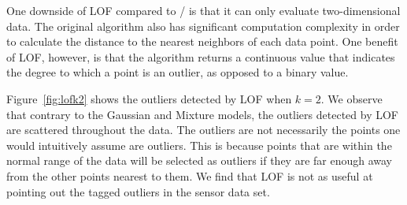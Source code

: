 One downside of LOF compared to \dBoost/ is that it can only evaluate two-dimensional data.
The original algorithm also has significant computation complexity in order to calculate the distance to the nearest neighbors of each data point.
One benefit of LOF, however, is that the algorithm returns a continuous value that indicates the degree to which a point is an outlier, as opposed to a binary value.

Figure~\ref{fig:lofk2} shows the outliers detected by LOF when $k=2$.
We observe that contrary to the Gaussian and Mixture models, the outliers detected by LOF are scattered throughout the data.
The outliers are not necessarily the points one would intuitively assume are outliers.
This is because points that are within the normal range of the data will be selected as outliers if they are far enough away from the other points nearest to them.
We find that LOF is not as useful at pointing out the tagged outliers in the sensor data set.


